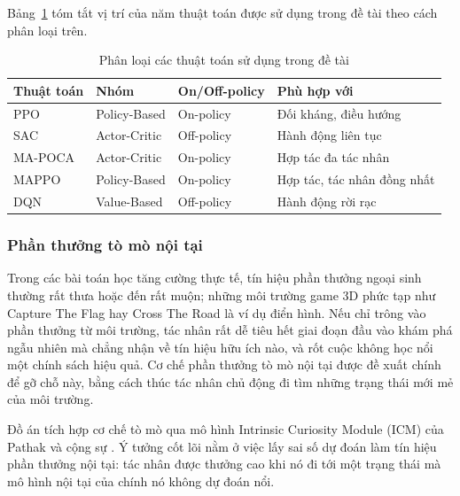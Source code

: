 \indent Bảng~\ref{tab:rl_comparison} tóm tắt vị trí của năm thuật toán được sử dụng
trong đề tài theo cách phân loại trên.

\begin{table}[H]
\centering
\caption{Phân loại các thuật toán sử dụng trong đề tài}
\label{tab:rl_comparison}
\renewcommand{\arraystretch}{1.4}
\tablefont
\begin{tabular}{|>{\centering\arraybackslash}p{2.5cm}
                |>{\centering\arraybackslash}p{3cm}
                |>{\centering\arraybackslash}p{3cm}
                |>{\centering\arraybackslash}p{4.5cm}|}
\hline
\textbf{Thuật toán} & \textbf{Nhóm} & \textbf{On/Off-policy} & \textbf{Phù hợp với} \\
\hline
PPO      & Policy-Based      & On-policy  & Đối kháng, điều hướng \\
\hline
SAC      & Actor-Critic      & Off-policy & Hành động liên tục    \\
\hline
MA-POCA  & Actor-Critic      & On-policy  & Hợp tác đa tác nhân   \\
\hline
MAPPO    & Policy-Based      & On-policy  & Hợp tác, tác nhân đồng nhất \\
\hline
DQN      & Value-Based       & Off-policy & Hành động rời rạc \\
\hline
\end{tabular}
\end{table}

\subsubsection{Phần thưởng tò mò nội tại}
\label{sub:curiosity}

\indent Trong các bài toán học tăng cường thực tế, tín hiệu phần thưởng ngoại sinh thường
rất thưa hoặc đến rất muộn; những môi trường game 3D phức tạp như Capture The Flag hay
Cross The Road là ví dụ điển hình. Nếu chỉ trông vào phần thưởng từ môi trường, tác nhân
rất dễ tiêu hết giai đoạn đầu vào khám phá ngẫu nhiên mà chẳng nhận về tín hiệu hữu ích
nào, và rốt cuộc không học nổi một chính sách hiệu quả. Cơ chế phần thưởng tò mò nội tại được đề xuất chính để gỡ chỗ này, bằng cách thúc tác nhân chủ động
đi tìm những trạng thái mới mẻ của môi trường.

\indent Đồ án tích hợp cơ chế tò mò qua mô hình Intrinsic Curiosity Module (ICM) của
Pathak và cộng sự \cite{pathak2017curiosity}. Ý tưởng cốt lõi nằm ở việc lấy sai số dự
đoán làm tín hiệu phần thưởng nội tại: tác nhân được thưởng cao khi nó
đi tới một trạng thái mà mô hình nội tại của chính nó không dự đoán nổi.

